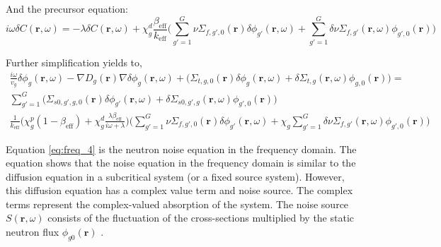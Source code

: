 And the precursor equation:
\begin{equation}
        i \omega \delta C(\textbf{r}, \omega) = - \lambda \delta C(\textbf{r}, \omega) + \chi^d_g \frac{\beta_{\text{eff}}}{k_{\text{eff}}}\biggl(\sum_{g' = 1}^{G} \nu \Sigma_{f,g',0}(\textbf{r}) \delta \phi_{g'}(\textbf{r}, \omega) + \sum_{g' = 1}^{G} \delta \nu \Sigma_{f,g'}(\textbf{r}, \omega) \phi_{g',0}(\textbf{r}) \biggr)
        \label{eq:freq_2}
\end{equation}

Further simplification yields to,
\begin{equation}
        \begin{aligned}
                \frac{i \omega}{v_g} \delta \phi_g (\textbf{r}, \omega) - \nabla D_g(\textbf{r}) \nabla \delta \phi_g(\textbf{r}, \omega) + \biggl(\Sigma_{t,g,0}(\textbf{r}) \delta \phi_g(\textbf{r}, \omega) + \delta \Sigma_{t,g}(\textbf{r}, \omega) \phi_{g,0}(\textbf{r}) \biggr) = \\
                \sum_{g' = 1}^{G} \biggl(\Sigma_{s0,g',g,0}(\textbf{r}) \delta \phi_{g'}(\textbf{r}, \omega) + \delta \Sigma_{s0,g',g}(\textbf{r}, \omega) \phi_{g',0}(\textbf{r}) \biggr)\\
                \frac{1}{k_{\text{eff}}} \biggl( \chi^p_g (1-\beta_{\text{eff}}) + \chi^d_g \frac{\lambda \beta_{\text{eff}}}{i \omega + \lambda} \biggr)  \biggl(\sum_{g' = 1}^{G} \nu \Sigma_{f,g',0}(\textbf{r}) \delta \phi_{g'}(\textbf{r}, \omega) + \chi_g \sum_{g' = 1}^{G} \delta \nu \Sigma_{f,g'}(\textbf{r}, \omega) \phi_{g',0}(\textbf{r}) \biggr)
        \end{aligned}
        \label{eq:freq_4}
\end{equation}

Equation \ref{eq:freq_4} is the neutron noise equation in the frequency domain. The equation shows that the noise equation in the frequency domain is similar to the diffusion equation in a subcritical system (or a fixed source system). However, this diffusion equation has a complex value term and noise source. The complex terms represent the complex-valued absorption of the system. The noise source  $S (\textbf{r}, \omega)$ consists of the fluctuation of the cross-sections multiplied by the static neutron flux $\phi_{g0} (\textbf{r})$ \cite{pazsitDynamicAdjointGreen2015}. 

